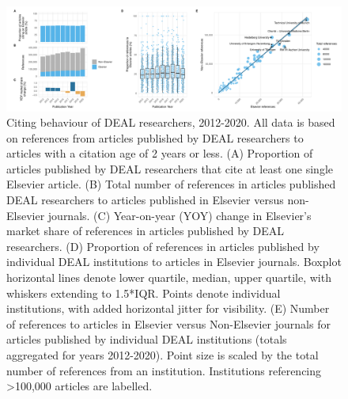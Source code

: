 \documentclass[
]{article}
\begin{document}
\begin{figure}
\centering
\includegraphics{analysis_files/figure-latex/references-publisher-year-1.pdf}
\caption{\label{fig:references-publisher-year}Citing behaviour of DEAL researchers, 2012-2020. All data is based on references from articles published by DEAL researchers to articles with a citation age of 2 years or less. (A) Proportion of articles published by DEAL researchers that cite at least one single Elsevier article. (B) Total number of references in articles published DEAL researchers to articles published in Elsevier versus non-Elsevier journals. (C) Year-on-year (YOY) change in Elsevier's market share of references in articles published by DEAL researchers. (D) Proportion of references in articles published by individual DEAL institutions to articles in Elsevier journals. Boxplot horizontal lines denote lower quartile, median, upper quartile, with whiskers extending to 1.5*IQR. Points denote individual institutions, with added horizontal jitter for visibility. (E) Number of references to articles in Elsevier versus Non-Elsevier journals for articles published by individual DEAL institutions (totals aggregated for years 2012-2020). Point size is scaled by the total number of references from an institution. Institutions referencing \textgreater100,000 articles are labelled.}
\end{figure}
\end{document}
